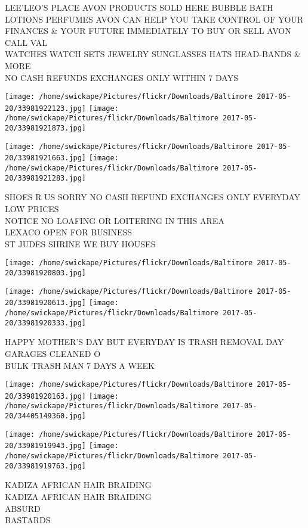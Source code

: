 \documentclass[10pt,letterpaper]{article}
\begin{document}
LEE'LEO'S PLACE AVON PRODUCTS SOLD HERE BUBBLE BATH LOTIONS PERFUMES AVON CAN HELP YOU TAKE CONTROL OF YOUR FINANCES \& YOUR FUTURE IMMEDIATELY TO BUY OR SELL AVON CALL VAL\\
WATCHES WATCH SETS JEWELRY SUNGLASSES HATS HEAD{-}BANDS \& MORE\\
NO CASH REFUNDS EXCHANGES ONLY WITHIN 7 DAYS
\pagebreak

\texttt{[image: /home/swickape/Pictures/flickr/Downloads/Baltimore 2017-05-20/33981922123.jpg]}
\texttt{[image: /home/swickape/Pictures/flickr/Downloads/Baltimore 2017-05-20/33981921873.jpg]}

\texttt{[image: /home/swickape/Pictures/flickr/Downloads/Baltimore 2017-05-20/33981921663.jpg]}
\texttt{[image: /home/swickape/Pictures/flickr/Downloads/Baltimore 2017-05-20/33981921283.jpg]}

SHOES R US SORRY NO CASH REFUND EXCHANGES ONLY EVERYDAY LOW PRICES\\
NOTICE NO LOAFING OR LOITERING IN THIS AREA\\
LEXACO OPEN FOR BUSINESS\\
ST JUDES SHRINE WE BUY HOUSES
\pagebreak

\texttt{[image: /home/swickape/Pictures/flickr/Downloads/Baltimore 2017-05-20/33981920803.jpg]}

\vspace{0.25in}
\texttt{[image: /home/swickape/Pictures/flickr/Downloads/Baltimore 2017-05-20/33981920613.jpg]}
\texttt{[image: /home/swickape/Pictures/flickr/Downloads/Baltimore 2017-05-20/33981920333.jpg]}

HAPPY MOTHER'S DAY BUT EVERYDAY IS TRASH REMOVAL DAY\\
GARAGES CLEANED O\\
BULK TRASH MAN 7 DAYS A WEEK
\pagebreak

\texttt{[image: /home/swickape/Pictures/flickr/Downloads/Baltimore 2017-05-20/33981920163.jpg]}
\texttt{[image: /home/swickape/Pictures/flickr/Downloads/Baltimore 2017-05-20/34405149360.jpg]}

\texttt{[image: /home/swickape/Pictures/flickr/Downloads/Baltimore 2017-05-20/33981919943.jpg]}
\texttt{[image: /home/swickape/Pictures/flickr/Downloads/Baltimore 2017-05-20/33981919763.jpg]}

KADIZA AFRICAN HAIR BRAIDING\\
KADIZA AFRICAN HAIR BRAIDING\\
ABSURD\\
BASTARDS
\pagebreak
\end{document}
